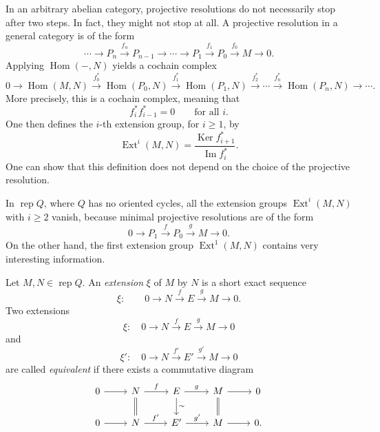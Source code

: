 \documentclass[11pt, a4paper]{report}
\begin{document}
\begin{remark}
In an arbitrary abelian category, projective resolutions do not necessarily stop after
two steps. In fact, they might not stop at all. A projective resolution in a general
category is of the form
\[
\cdots
\longrightarrow
P_n
\xrightarrow{f_n}
P_{n-1}
\longrightarrow
\cdots
\longrightarrow
P_1
\xrightarrow{f_1}
P_0
\xrightarrow{f_0}
M
\longrightarrow
0.
\]
Applying \(\operatorname{Hom}(-,N)\) yields a cochain complex
\[
0
\longrightarrow
\operatorname{Hom}(M,N)
\xrightarrow{f_0^\ast}
\operatorname{Hom}(P_0,N)
\xrightarrow{f_1^\ast}
\operatorname{Hom}(P_1,N)
\xrightarrow{f_2^\ast}
\cdots
\xrightarrow{f_n^\ast}
\operatorname{Hom}(P_n,N)
\longrightarrow
\cdots .
\]
More precisely, this is a cochain complex, meaning that
\[
f_i^\ast f_{i-1}^\ast=0
\qquad
\text{for all } i.
\]
One then defines the \(i\)-th extension group, for \(i\geq 1\), by
\[
\operatorname{Ext}^i(M,N)
=
\frac{\operatorname{Ker} f_{i+1}^\ast}
     {\operatorname{Im} f_i^\ast}.
\]
One can show that this definition does not depend on the choice of the projective
resolution.

In \(\operatorname{rep}Q\), where \(Q\) has no oriented cycles, all the
extension groups \(\operatorname{Ext}^i(M,N)\) with \(i\geq 2\) vanish, because
minimal projective resolutions are of the form
\[
0
\longrightarrow
P_1
\xrightarrow{f}
P_0
\xrightarrow{g}
M
\longrightarrow
0.
\]
On the other hand, the first extension group \(\operatorname{Ext}^1(M,N)\)
contains very interesting information.
\end{remark}

    \begin{definition}[Extensions]
    Let \(M,N\in \operatorname{rep}Q\). An \emph{extension} \(\xi\) of \(M\) by \(N\)
    is a short exact sequence
    \[
        \xi:\qquad
        0
        \longrightarrow
        N
        \xrightarrow{f}
        E
        \xrightarrow{g}
        M
        \longrightarrow
        0.
    \]
    Two extensions
    \[
        \xi:\quad
        0\longrightarrow N\xrightarrow{f}E\xrightarrow{g}M\longrightarrow 0
    \]
    and
    \[
        \xi':\quad
        0\longrightarrow N\xrightarrow{f'}E'\xrightarrow{g'}M\longrightarrow 0
    \]
    are called \emph{equivalent} if there exists a commutative diagram
    \[
    \begin{tikzcd}
    0 \arrow[r] &
    N \arrow[r,"f"] \arrow[d,equal] &
    E \arrow[r,"g"] \arrow[d,"\sim"] &
    M \arrow[r] \arrow[d,equal] &
    0 \\
    0 \arrow[r] &
    N \arrow[r,"f'"] &
    E' \arrow[r,"g'"] &
    M \arrow[r] &
    0 .
    \end{tikzcd}
    \]
    \end{definition}
\end{document}
